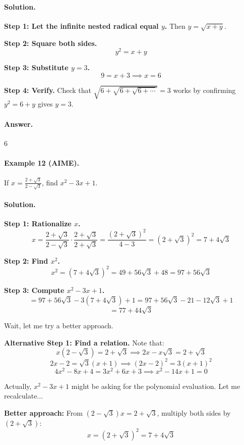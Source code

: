 \documentclass[12pt]{extarticle}
\begin{document}
\paragraph{Solution.}
\textbf{Step 1: Let the infinite nested radical equal $y$.} Then $y = \sqrt{x+y}$.

\textbf{Step 2: Square both sides.}
\[
y^2 = x + y
\]

\textbf{Step 3: Substitute $y=3$.}
\[
9 = x + 3 \implies x = 6
\]

\textbf{Step 4: Verify.} Check that $\sqrt{6+\sqrt{6+\sqrt{6+\cdots}}} = 3$ works by confirming $y^2 = 6+y$ gives $y=3$.

\paragraph{Answer.} $\boxed{6}$

\paragraph{Example 12 (AIME).} If $x = \frac{2+\sqrt{3}}{2-\sqrt{3}}$, find $x^2 - 3x + 1$.

\paragraph{Solution.}
\textbf{Step 1: Rationalize $x$.}
\[
x = \frac{2+\sqrt{3}}{2-\sqrt{3}} \cdot \frac{2+\sqrt{3}}{2+\sqrt{3}} = \frac{(2+\sqrt{3})^2}{4-3} = (2+\sqrt{3})^2 = 7 + 4\sqrt{3}
\]

\textbf{Step 2: Find $x^2$.}
\[
x^2 = (7+4\sqrt{3})^2 = 49 + 56\sqrt{3} + 48 = 97 + 56\sqrt{3}
\]

\textbf{Step 3: Compute $x^2 - 3x + 1$.}
\[
= 97 + 56\sqrt{3} - 3(7+4\sqrt{3}) + 1 = 97 + 56\sqrt{3} - 21 - 12\sqrt{3} + 1
\]
\[
= 77 + 44\sqrt{3}
\]

Wait, let me try a better approach.

\textbf{Alternative Step 1: Find a relation.} Note that:
\[
x(2-\sqrt{3}) = 2+\sqrt{3} \implies 2x - x\sqrt{3} = 2+\sqrt{3}
\]
\[
2x - 2 = \sqrt{3}(x+1) \implies (2x-2)^2 = 3(x+1)^2
\]
\[
4x^2 - 8x + 4 = 3x^2 + 6x + 3 \implies x^2 - 14x + 1 = 0
\]

Actually, $x^2 - 3x + 1$ might be asking for the polynomial evaluation. Let me recalculate...

\textbf{Better approach:} From $(2-\sqrt{3})x = 2+\sqrt{3}$, multiply both sides by $(2+\sqrt{3})$:
\[
x = (2+\sqrt{3})^2 = 7+4\sqrt{3}
\]
\end{document}
